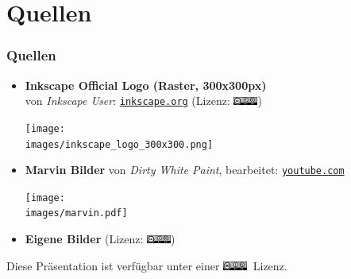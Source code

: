 \documentclass[german]{beamer} %
\newcommand{\images}{vektorzeichnen/}
\newcommand{\ccbysa}{\includegraphics[height=0.11in]{cc-by-sa.png}}
\begin{document}












 

\section{Quellen}
\begin{frame}
  \frametitle{Quellen}
  
  \begin{itemize}
  	\item \textbf{Inkscape Official Logo (Raster, 300x300px)}\\ von \textit{Inkscape User}: \href{https://inkscape.org/en/gallery/item/1088/}{\texttt{inkscape.org}} (Lizenz: \ccbysa) \par
  	        \begin{minipage}{\linewidth}
  	            \centering
  	            \texttt{[image: \\images/inkscape\_logo\_300x300.png]}
  	        \end{minipage}
  			
  	\item \textbf{Marvin Bilder} von \textit{Dirty White Paint}, bearbeitet: \href{https://www.youtube.com/user/DirtyWhitePaint}{\texttt{youtube.com}} \par
			\begin{minipage}{\linewidth}
  	            \centering
  	            \texttt{[image: \\images/marvin.pdf]}
  	        \end{minipage}
  	\item \textbf{Eigene Bilder} (Lizenz: \ccbysa)
  \end{itemize}
  
  \centering
  Diese Präsentation ist verfügbar unter einer \ccbysa $\ $ Lizenz.
  
 \end{frame}

\end{document}
